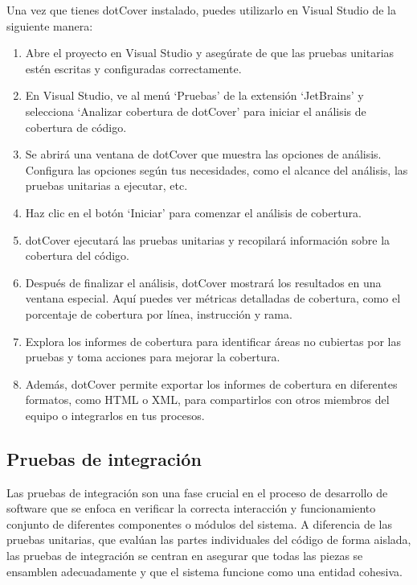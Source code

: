 \documentclass[executivepaper]{article}
\begin{document}
Una vez que tienes dotCover instalado, puedes utilizarlo en Visual Studio de la siguiente manera:

\begin{enumerate}
  \item Abre el proyecto en Visual Studio y asegúrate de que las pruebas unitarias estén escritas y configuradas correctamente.
  \item En Visual Studio, ve al menú \enquote*{Pruebas} de la extensión \enquote*{JetBrains} y selecciona \enquote*{Analizar cobertura de dotCover} para iniciar el análisis de cobertura de código.
  \item Se abrirá una ventana de dotCover que muestra las opciones de análisis. Configura las opciones según tus necesidades, como el alcance del análisis, las pruebas unitarias a ejecutar, etc.
  \item Haz clic en el botón \enquote*{Iniciar} para comenzar el análisis de cobertura.
  \item dotCover ejecutará las pruebas unitarias y recopilará información sobre la cobertura del código.
  \item Después de finalizar el análisis, dotCover mostrará los resultados en una ventana especial. Aquí puedes ver métricas detalladas de cobertura, como el porcentaje de cobertura por línea, instrucción y rama.
  \item Explora los informes de cobertura para identificar áreas no cubiertas por las pruebas y toma acciones para mejorar la cobertura.
  \item Además, dotCover permite exportar los informes de cobertura en diferentes formatos, como HTML o XML, para compartirlos con otros miembros del equipo o integrarlos en tus procesos.
\end{enumerate}

\subsection{Pruebas de integración}

Las pruebas de integración son una fase crucial en el proceso de desarrollo de software que se enfoca en verificar la correcta interacción y funcionamiento conjunto de diferentes componentes o módulos del sistema. A diferencia de las pruebas unitarias, que evalúan las partes individuales del código de forma aislada, las pruebas de integración se centran en asegurar que todas las piezas se ensamblen adecuadamente y que el sistema funcione como una entidad cohesiva.
\end{document}
